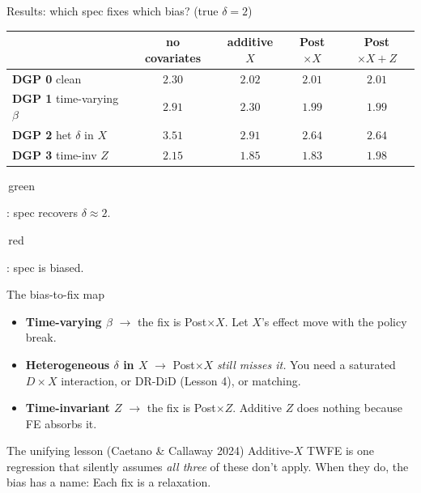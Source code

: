 \documentclass[aspectratio=169,11pt]{beamer}
\begin{document}
\begin{frame}{Results: which spec fixes which bias? \;\;(true $\delta = 2$)}
\vspace{0.4em}
\begin{center}
\renewcommand{\arraystretch}{1.35}
\footnotesize
\begin{tabular}{@{}l|cccc@{}}
\toprule
 & \textbf{no covariates} & \textbf{additive $X$} & \textbf{Post${\times}X$} & \textbf{Post${\times}X+Z$} \\
\midrule
\textbf{DGP 0} clean              & \cellcolor{biasedred}$2.30$ & \cellcolor{remixgreenlight}$2.02$ & \cellcolor{remixgreenlight}$2.01$ & \cellcolor{remixgreenlight}$2.01$ \\
\textbf{DGP 1} time-varying $\beta$ & \cellcolor{biasedred}$2.91$ & \cellcolor{biasedred}$2.30$ & \cellcolor{remixgreenlight}$1.99$ & \cellcolor{remixgreenlight}$1.99$ \\
\textbf{DGP 2} het $\delta$ in $X$    & \cellcolor{biasedred}$3.51$ & \cellcolor{biasedred}$2.91$ & \cellcolor{biasedred}$2.64$ & \cellcolor{biasedred}$2.64$ \\
\textbf{DGP 3} time-inv $Z$         & \cellcolor{biasedred}$2.15$ & \cellcolor{biasedred}$1.85$ & \cellcolor{biasedred}$1.83$ & \cellcolor{remixgreenlight}$1.98$ \\
\bottomrule
\end{tabular}
\end{center}
\vspace{0.5em}
\begin{center}
\footnotesize\color{warmgray}\itshape
\colorbox{remixgreenlight}{\strut\,green\,}: spec recovers $\delta \approx 2$. \quad \colorbox{biasedred}{\strut\,red\,}: spec is biased.
\end{center}
\end{frame}

\begin{frame}{The bias-to-fix map}
\footnotesize
\begin{itemize}\setlength\itemsep{4pt}
  \item \textbf{Time-varying $\beta$} \;$\to$ \;the fix is Post${\times}X$. \;Let $X$'s effect move with the policy break.
  \item \textbf{Heterogeneous $\delta$ in $X$} \;$\to$ \;Post${\times}X$ \textit{still misses it.} \;You need a saturated $D{\times}X$ interaction, or DR-DiD (Lesson 4), or matching.
  \item \textbf{Time-invariant $Z$} \;$\to$ \;the fix is Post${\times}Z$. \;Additive $Z$ does nothing because FE absorbs it.
\end{itemize}

\vspace{0.4em}
\begin{block}{The unifying lesson (Caetano \& Callaway 2024)}
\small
Additive-$X$ TWFE is one regression that silently assumes \textit{all three} of these don't apply. \;When they do, the bias has a name:  \;Each fix is a relaxation.
\end{block}
\end{frame}
\end{document}
